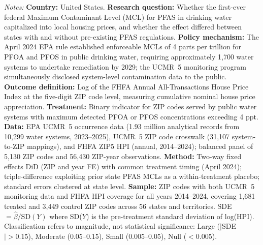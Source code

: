 \begin{table}[htbp]
\par\vspace{0.3em}\begin{minipage}{\textwidth}{\footnotesize \textit{Notes:} \textbf{Country:} United States. \textbf{Research question:} Whether the first-ever federal Maximum Contaminant Level (MCL) for PFAS in drinking water capitalized into local housing prices, and whether the effect differed between states with and without pre-existing PFAS regulations. \textbf{Policy mechanism:} The April 2024 EPA rule established enforceable MCLs of 4 parts per trillion for PFOA and PFOS in public drinking water, requiring approximately 1,700 water systems to undertake remediation by 2029; the UCMR~5 monitoring program simultaneously disclosed system-level contamination data to the public. \textbf{Outcome definition:} Log of the FHFA Annual All-Transactions House Price Index at the five-digit ZIP code level, measuring cumulative nominal house price appreciation. \textbf{Treatment:} Binary indicator for ZIP codes served by public water systems with maximum detected PFOA or PFOS concentrations exceeding 4 ppt. \textbf{Data:} EPA UCMR~5 occurrence data (1.93 million analytical records from 10,299 water systems, 2023--2025), UCMR~5 ZIP code crosswalk (31,107 system-to-ZIP mappings), and FHFA ZIP5 HPI (annual, 2014--2024); balanced panel of 5,130 ZIP codes and 56,430 ZIP-year observations. \textbf{Method:} Two-way fixed effects DiD (ZIP and year FE) with common treatment timing (April 2024); triple-difference exploiting prior state PFAS MCLs as a within-treatment placebo; standard errors clustered at state level. \textbf{Sample:} ZIP codes with both UCMR~5 monitoring data and FHFA HPI coverage for all years 2014--2024, covering 1,681 treated and 3,449 control ZIP codes across 56 states and territories. SDE $= \hat{\beta} / \text{SD}(Y)$ where SD($Y$) is the pre-treatment standard deviation of log(HPI). Classification refers to magnitude, not statistical significance: Large ($|$SDE$| > 0.15$), Moderate ($0.05$--$0.15$), Small ($0.005$--$0.05$), Null ($< 0.005$).}\end{minipage}
\end{table}

